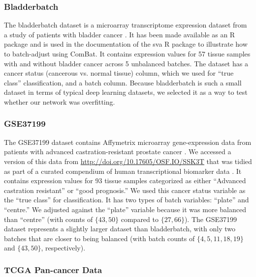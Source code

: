 \documentclass[notitlepage]{article}
\begin{document}
\subsubsection{Bladderbatch}

The bladderbatch dataset is a microarray transcriptome expression dataset from a study of patients with bladder cancer \cite{dyrskjot_gene_2004}.
It has been made available as an R package \cite{leek_bladderbatch_2017} and is used in the documentation of the sva R package \cite{leek_sva_2017} to illustrate how to batch-adjust using ComBat.
It contains expression values for 57 tissue samples with and without bladder cancer across 5 unbalanced batches.
The dataset has a cancer status (cancerous vs. normal tissue) column, which we used for ``true class'' classification, and a batch column.
Because bladderbatch is such a small dataset in terms of typical deep learning datasets, we selected it as a way to test whether our network was overfitting.

\subsubsection{GSE37199}

The GSE37199 dataset contains Affymetrix microarray gene-expression data from patients with advanced castration-resistant prostate cancer \cite{olmos_prognostic_2012}.
We accessed a version of this data from \href{http://doi.org/10.17605/OSF.IO/SSK3T}{http://doi.org/10.17605/OSF.IO/SSK3T} that was tidied as part of a curated compendium of human transcriptional biomarker data \cite{golightly_curated_2018}.
It contains expression values for 93 tissue samples categorized as either ``Advanced castration resistant'' or ``good prognosis.''
We used this cancer status variable as the ``true class'' for classification.
It has two types of batch variables: ``plate'' and ``centre.''
We adjusted against the ``plate'' variable because it was more balanced than ``centre'' (with counts of $\{43, 50\}$ compared to $\{27, 66\}$).
The GSE37199 dataset represents a slightly larger dataset than bladderbatch, with only two batches that are closer to being balanced (with batch counts of $\{4, 5, 11, 18, 19\}$ and $\{43, 50\}$, respectively).

\subsubsection{TCGA Pan-cancer Data}
\end{document}
